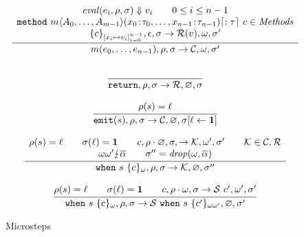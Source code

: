 \begin{figure}
$$\begin{array}{c}
      \cfrac{
      \begin{array}{c}
        \eval{e_i}{\env}{\heap} \Downarrow v_i \qquad 0\leq i \leq n-1                                                                                 \\
        {\tt{method}}~m\langle A_0,\ldots,A_{m-1}\rangle(\field{x_0}{\tau_0},\ldots,\field{x_{n-1}}{\tau_{n-1}})\lceil :\tau\rceil~c \in {\mathit{Methods}} \\
        \{c\}_{[x_i \mapsto v_i]_{i=0}^{n-1}},\epsilon, \heap \rightarrow \ret(v), \omega, \heap'
      \end{array}
      }{
      m(e_0,\ldots,e_{n-1}), \env, \heap \rightarrow \continue, \omega, \heap'
      }
      \\\\
      \cfrac{

      }{
        \return,\env,\heap \rightarrow \mathcal{R},\varnothing,\heap
      }
      \\\\
      \cfrac{
        \rho(s) = \ell  
      }{
        \emit(s),\env,\heap \rightarrow \mathcal{C},\varnothing,\heap[\ell \leftarrow \present]
      }
      \\\\
      \cfrac{
        \begin{array}{c}
          \env(s) = \ell \qquad \sigma(\ell) = \present
          \qquad c,\env\cdot \varnothing,\heap,\rightarrow \mathcal{K},\omega',\heap'
          \qquad \mathcal{K} \in \continue,\ret \\
          \omega\omega' \lightning \overline{\alpha} \qquad
          \sigma'' = {\mathit{drop}}(\omega,\overline{\alpha})
        \end{array}
      }{
        \when{s}{\{c\}_\omega},\env,\heap\rightarrow
        \mathcal{K},\varnothing,\heap''
      }
      \\\\
      \cfrac{
      \env(s) = \ell \qquad \sigma(\ell) = \present \qquad
      c,\env \cdot \omega,\heap \rightarrow \suspend~c',\omega',\heap'
      }
      {
      \when{s}{\{c\}_\omega},\env,\heap\rightarrow
      \suspend~\when{s}{\{c'\}_{\omega\omega'}},\varnothing,\heap'
      }
    \end{array}
  $$
  \caption{Microsteps}
  \label{fig:sem2}
\end{figure}
